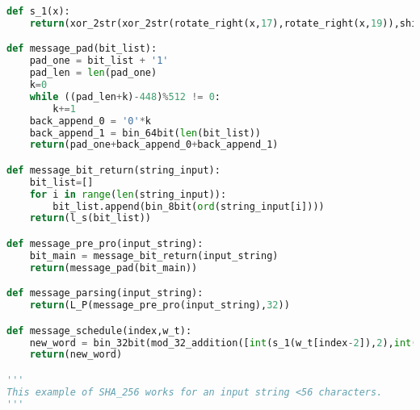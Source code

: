 \documentclass[12pt]{article}
\begin{document}
\begin{lstlisting}[language=Python]
def s_1(x):
    return(xor_2str(xor_2str(rotate_right(x,17),rotate_right(x,19)),shift_right(x,10)))

def message_pad(bit_list):
    pad_one = bit_list + '1'
    pad_len = len(pad_one)
    k=0
    while ((pad_len+k)-448)%512 != 0:
        k+=1
    back_append_0 = '0'*k
    back_append_1 = bin_64bit(len(bit_list))
    return(pad_one+back_append_0+back_append_1)

def message_bit_return(string_input):
    bit_list=[]
    for i in range(len(string_input)):
        bit_list.append(bin_8bit(ord(string_input[i])))
    return(l_s(bit_list))

def message_pre_pro(input_string):
    bit_main = message_bit_return(input_string)
    return(message_pad(bit_main))

def message_parsing(input_string):
    return(L_P(message_pre_pro(input_string),32))

def message_schedule(index,w_t):
    new_word = bin_32bit(mod_32_addition([int(s_1(w_t[index-2]),2),int(w_t[index-7],2),int(s_0(w_t[index-15]),2),int(w_t[index-16],2)]))
    return(new_word)

'''
This example of SHA_256 works for an input string <56 characters.
'''


\end{lstlisting}
\end{document}
